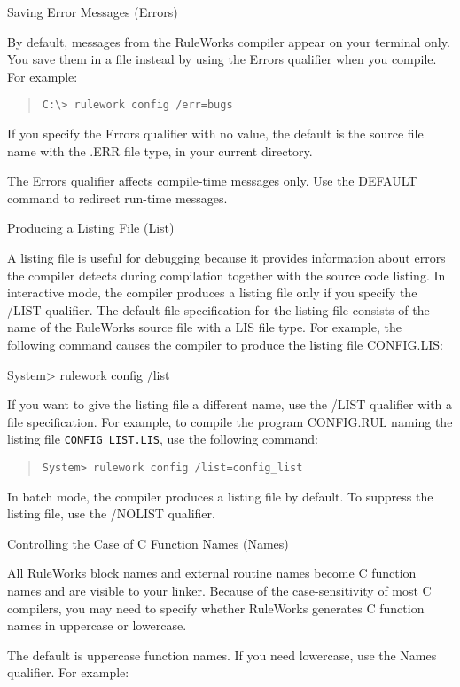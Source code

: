 Saving Error Messages (Errors)

By default, messages from the RuleWorks compiler appear
on your terminal only. You save them in a file instead by
using the Errors qualifier when you compile. For example:
\begin{quote}
\begin{verbatim}
C:\> rulework config /err=bugs
\end{verbatim}
\end{quote}  
If you specify the Errors qualifier with no value, the
default is the source file name with the .ERR file type,
in your current directory.

The Errors qualifier affects compile-time messages only.
Use the DEFAULT command to redirect run-time messages.

Producing a Listing File (List)

A listing file is useful for debugging because it
provides information about errors the compiler detects
during compilation together with the source code listing.
In interactive mode, the compiler produces a listing file
only if you specify the /LIST qualifier. The default file
specification for the listing file consists of the name
of the RuleWorks source file with a LIS file type. For
example, the following command causes the compiler to
produce the listing file CONFIG.LIS:

System> rulework config /list

If you want to give the listing file a different name,
use the /LIST qualifier with a file specification. For
example, to compile the program CONFIG.RUL naming the
listing file \verb|CONFIG_LIST.LIS|, use the following command:
\begin{quote}
\begin{verbatim}
System> rulework config /list=config_list
\end{verbatim}
\end{quote}  
In batch mode, the compiler produces a listing file by
default. To suppress the listing file, use the /NOLIST
qualifier.

Controlling the Case of C Function Names (Names)

All RuleWorks block names and external routine names
become C function names and are visible to your linker.
Because of the case-sensitivity of most C compilers, you
may need to specify whether RuleWorks generates C
function names in uppercase or lowercase.

The default is uppercase function names. If you need
lowercase, use the Names qualifier. For example:

